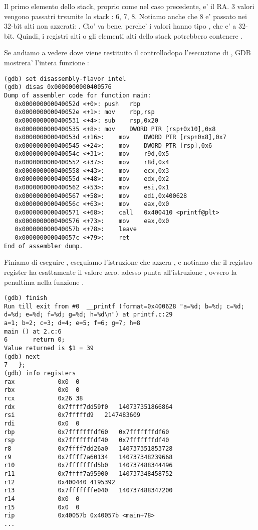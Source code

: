 Il primo elemento dello stack, proprio come nel caso precedente, e' il {RA}.
3 valori vengono passatri trvamite lo stack : 6, 7, 8.
Notiamo anche che 8 e' passato nei 32-bit alti non azzerati: .
Cio' va bene, perche' i valori hanno tipo \Tint , che e' a 32-bit.
Quindi, i registri alti o gli elementi alti dello stack potrebbero contenere .

Se andiamo a vedere dove viene restituito il controllodopo l'esecuzione di \printf, 
\ac{GDB} mostrera' l'intera funzione \main:

\begin{lstlisting}[style=customasmx86]
(gdb) set disassembly-flavor intel
(gdb) disas 0x0000000000400576
Dump of assembler code for function main:
   0x000000000040052d <+0>:	push   rbp
   0x000000000040052e <+1>:	mov    rbp,rsp
   0x0000000000400531 <+4>:	sub    rsp,0x20
   0x0000000000400535 <+8>:	mov    DWORD PTR [rsp+0x10],0x8
   0x000000000040053d <+16>:	mov    DWORD PTR [rsp+0x8],0x7
   0x0000000000400545 <+24>:	mov    DWORD PTR [rsp],0x6
   0x000000000040054c <+31>:	mov    r9d,0x5
   0x0000000000400552 <+37>:	mov    r8d,0x4
   0x0000000000400558 <+43>:	mov    ecx,0x3
   0x000000000040055d <+48>:	mov    edx,0x2
   0x0000000000400562 <+53>:	mov    esi,0x1
   0x0000000000400567 <+58>:	mov    edi,0x400628
   0x000000000040056c <+63>:	mov    eax,0x0
   0x0000000000400571 <+68>:	call   0x400410 <printf@plt>
   0x0000000000400576 <+73>:	mov    eax,0x0
   0x000000000040057b <+78>:	leave  
   0x000000000040057c <+79>:	ret    
End of assembler dump.
\end{lstlisting}

Finiamo di eseguire \printf, eseguiamo l'istruzione che azzera \EAX, e notiamo che il registro \EAX register ha esattamente il valore zero.
\RIP adesso punta all'istruzione  , ovvero la penultima nella funzione \main.

\begin{lstlisting}
(gdb) finish
Run till exit from #0  __printf (format=0x400628 "a=%d; b=%d; c=%d; d=%d; e=%d; f=%d; g=%d; h=%d\n") at printf.c:29
a=1; b=2; c=3; d=4; e=5; f=6; g=7; h=8
main () at 2.c:6
6		return 0;
Value returned is $1 = 39
(gdb) next
7	};
(gdb) info registers
rax            0x0	0
rbx            0x0	0
rcx            0x26	38
rdx            0x7ffff7dd59f0	140737351866864
rsi            0x7fffffd9	2147483609
rdi            0x0	0
rbp            0x7fffffffdf60	0x7fffffffdf60
rsp            0x7fffffffdf40	0x7fffffffdf40
r8             0x7ffff7dd26a0	140737351853728
r9             0x7ffff7a60134	140737348239668
r10            0x7fffffffd5b0	140737488344496
r11            0x7ffff7a95900	140737348458752
r12            0x400440	4195392
r13            0x7fffffffe040	140737488347200
r14            0x0	0
r15            0x0	0
rip            0x40057b	0x40057b <main+78>
...
\end{lstlisting}
